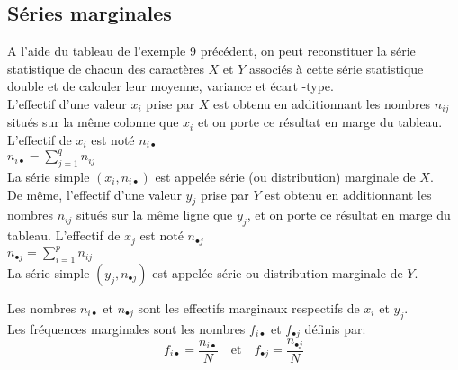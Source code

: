 \subsection*{Séries marginales}

A l’aide du tableau de l’exemple 9 précédent, on peut reconstituer la série statistique de chacun des caractères $X$ et $Y$ associés à cette série statistique double et de calculer leur moyenne, variance et écart -type.\\
L’effectif d’une valeur $x_i$ prise par $X$ est obtenu en additionnant les nombres $n_{i j}$ situés sur la même colonne que $x_i$ et on porte ce résultat en marge du tableau. L’effectif de $x_i$ est noté $ n_{i \bullet} $\\
$ n_{i \bullet} =\displaystyle\sum _{j=1}^{q}n_{i j} $\\
La série simple $(x_i, n_{i \bullet} )$ est appelée série (ou distribution) marginale de $X$.\\
De même, l’effectif d’une valeur $y_j$ prise par $Y$ est obtenu en additionnant les nombres $ n_{i j}$ situés sur la même ligne que $y_j$, et on porte ce résultat en marge du tableau. L’effectif de $x_j$ est noté $n_{\bullet j}$\\
$ n_{ \bullet   j} =\displaystyle\sum _{i=1}^{p}n_{i j} $\\
La série simple $(y_j,n_{\bullet j} )$ est appelée série ou distribution marginale de $Y$.

\begin{definition}

Les nombres $ n_{i \bullet} $ et  $ n_{\bullet j} $  sont les effectifs marginaux respectifs  de $x_i$ et $y_j$.\\
Les fréquences marginales sont les nombres $f_{i \bullet} $ et $f_{ \bullet   j}$ définis par: \[ f_{i \bullet}=\frac{n_{i \bullet}}{N} \quad \text{et} \quad  f_{ \bullet  j}=\frac{n_{ \bullet  j}}{N}  \]


\end{definition}

